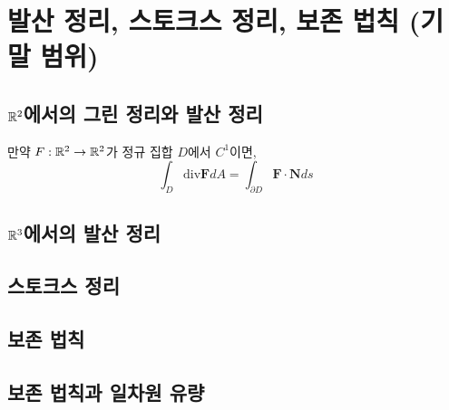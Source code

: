 \section{발산 정리, 스토크스 정리, 보존 법칙 (기말 범위)}
\subsection{$\mathbb{R}^2$에서의 그린 정리와 발산 정리}

\begin{theorem}[발산 정리]
만약 $F: \mathbb{R}^2 \to \mathbb{R}^2$가 정규 집합 $D$에서 $C^1$이면,
$$
\int_D \text{div} \textbf{F} dA = \int_{\partial D} \textbf{F} \cdot \textbf{N} ds 
$$
\end{theorem}

\subsection{$\mathbb{R}^3$에서의 발산 정리}
\subsection{스토크스 정리}
\subsection{보존 법칙}
\subsection{보존 법칙과 일차원 유량}
